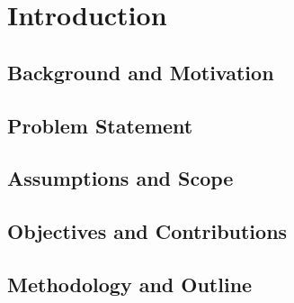 \chapter{Introduction}

\section{Background and Motivation}

\section{Problem Statement}

\section{Assumptions and Scope}

\section{Objectives and Contributions}

\section{Methodology and Outline}
